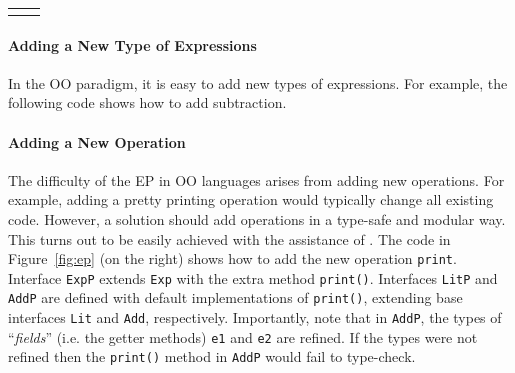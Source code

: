 \begin{figure*}
\centering
\saveSpaceFig
\begin{tabular}{l|l}
&
\end{tabular}
\caption{The Expression Problem (left: initial system, right: code for adding
  print operation).}\label{fig:ep}
\saveSpaceFig
\end{figure*}%

\paragraph{Adding a New Type of Expressions}
In the OO paradigm, it is easy to add new types of expressions. For example, the
following code shows how to add subtraction.


\paragraph{Adding a New Operation} The difficulty of the EP in OO
languages arises from adding new operations. For example, adding a pretty printing
operation would typically change all existing code. However, a solution
should add operations in a type-safe and modular way. This
turns out to be easily achieved with the assistance of \mixin.  The code in
Figure~\ref{fig:ep} (on the right) shows how to add the new operation \texttt{print}.
Interface \texttt{ExpP} extends \texttt{Exp} with the extra method
\texttt{print()}. Interfaces \texttt{LitP} and \texttt{AddP} are defined with
default implementations of \texttt{print()}, extending base interfaces
\texttt{Lit} and \texttt{Add}, respectively. Importantly, note that in
\texttt{AddP}, the types of ``\emph{fields}'' (i.e. the getter methods)
\texttt{e1} and \texttt{e2} are refined. If the types were not refined then
the \texttt{print()} method in \texttt{AddP} would fail to type-check.

